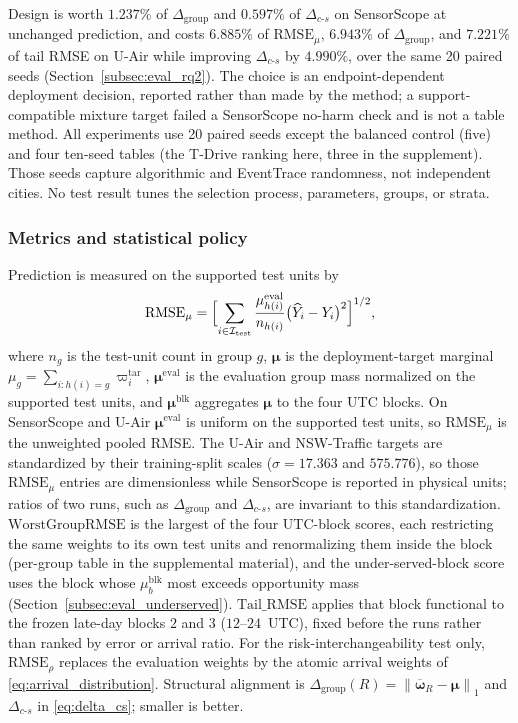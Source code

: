 \documentclass[letterpaper,journal]{IEEEtran}
\begin{document}
Design is
worth $1.237\%$ of
$\Delta_{\mathrm{group}}$ and $0.597\%$ of $\Delta_{c\text{-}s}$ on SensorScope at
unchanged prediction, and costs $6.885\%$ of $\mathrm{RMSE}_{\mu}$, $6.943\%$ of
$\Delta_{\mathrm{group}}$, and $7.221\%$ of tail RMSE on U-Air while improving
$\Delta_{c\text{-}s}$ by $4.990\%$, over the same 20 paired seeds
(Section~\ref{subsec:eval_rq2}).  The choice is an endpoint-dependent deployment
decision, reported rather than made by the method; a support-compatible mixture
target failed a SensorScope no-harm check and is not a table method.
All experiments use 20 paired seeds except the balanced control (five) and four ten-seed tables (the T-Drive
ranking here, three in the supplement).  Those seeds capture algorithmic and EventTrace randomness, not independent
cities.  No test result tunes the selection process, parameters, groups, or strata.

\subsubsection{Metrics and statistical policy}

Prediction is measured on the supported test units by
\[
 \mathrm{RMSE}_{\mu}
 =
 \Bigl[\sum_{i\in\mathcal{I}_{\mathrm{test}}}
 \frac{\mu^{\mathrm{eval}}_{h(i)}}{n_{h(i)}}
 \bigl(\widehat Y_i-Y_i\bigr)^2\Bigr]^{1/2},
\]
where $n_g$ is the test-unit count in group $g$, $\boldsymbol\mu$ is the
deployment-target marginal $\mu_g=\sum_{i:h(i)=g}\varpi_i^{\mathrm{tar}}$,
$\boldsymbol\mu^{\mathrm{eval}}$ is the evaluation group mass normalized on
the supported test units, and $\boldsymbol\mu^{\mathrm{blk}}$ aggregates
$\boldsymbol\mu$ to the four UTC blocks.  On SensorScope and U-Air
$\boldsymbol\mu^{\mathrm{eval}}$ is uniform on the supported test units, so
$\mathrm{RMSE}_{\mu}$ is the unweighted pooled RMSE.
The U-Air and NSW-Traffic targets are standardized by their training-split
scales ($\sigma=17.363$ and $575.776$), so those $\mathrm{RMSE}_{\mu}$ entries
are dimensionless while SensorScope is reported in physical units; ratios of two
runs, such as $\Delta_{\mathrm{group}}$ and $\Delta_{c\text{-}s}$, are invariant
to this standardization.  $\mathrm{WorstGroupRMSE}$ is the largest of the four
UTC-block scores, each restricting the same weights to its own test units and
renormalizing them inside the block (per-group table in the supplemental
material), and the under-served-block score uses the block whose
$\mu^{\mathrm{blk}}_b$ most exceeds opportunity mass
(Section~\ref{subsec:eval_underserved}).  $\mathrm{Tail\_RMSE}$ applies that
block functional to the frozen late-day blocks $2$ and $3$ ($12$--$24$~UTC),
fixed before the runs rather than ranked by error or arrival ratio.  For the
risk-interchangeability test only, $\mathrm{RMSE}_{\rho}$ replaces the evaluation
weights by the atomic arrival weights of \eqref{eq:arrival_distribution}.
Structural alignment is
$\Delta_{\mathrm{group}}(R)=\left\|\overline{\boldsymbol\omega}_R-\boldsymbol\mu\right\|_1$
and $\Delta_{c\text{-}s}$ in \eqref{eq:delta_cs}; smaller is better.
\end{document}
